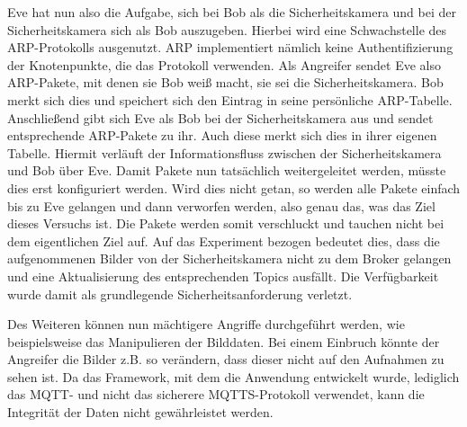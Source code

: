 Eve hat nun also die Aufgabe, sich bei Bob als die Sicherheitskamera und bei der
Sicherheitskamera sich als Bob auszugeben. Hierbei wird eine Schwachstelle des
ARP-Protokolls ausgenutzt. ARP implementiert nämlich keine Authentifizierung der
Knotenpunkte, die das Protokoll verwenden. Als Angreifer sendet Eve also
ARP-Pakete, mit denen sie Bob weiß macht, sie sei die Sicherheitskamera. Bob
merkt sich dies und speichert sich den Eintrag in seine persönliche ARP-Tabelle.
Anschließend gibt sich Eve als Bob bei der Sicherheitskamera aus und sendet
entsprechende ARP-Pakete zu ihr. Auch diese merkt sich dies in ihrer eigenen
Tabelle. Hiermit verläuft der Informationsfluss zwischen der Sicherheitskamera
und Bob über Eve. Damit Pakete nun tatsächlich weitergeleitet werden, müsste
dies erst konfiguriert werden. Wird dies nicht getan, so werden alle Pakete
einfach bis zu Eve gelangen und dann verworfen werden, also genau das, was das
Ziel dieses Versuchs ist. Die Pakete werden somit verschluckt und tauchen nicht
bei dem eigentlichen Ziel auf. Auf das Experiment bezogen bedeutet dies, dass
die aufgenommenen Bilder von der Sicherheitskamera nicht zu dem Broker gelangen
und eine Aktualisierung des entsprechenden Topics ausfällt. Die Verfügbarkeit
wurde damit als grundlegende Sicherheitsanforderung verletzt.

Des Weiteren können nun mächtigere Angriffe durchgeführt werden, wie
beispielsweise das Manipulieren der Bilddaten. Bei einem Einbruch könnte der
Angreifer die Bilder z.B. so verändern, dass dieser nicht auf den Aufnahmen zu
sehen ist. Da das Framework, mit dem die Anwendung entwickelt wurde, lediglich
das MQTT- und nicht das sicherere MQTTS-Protokoll verwendet, kann die Integrität
der Daten nicht gewährleistet werden.
